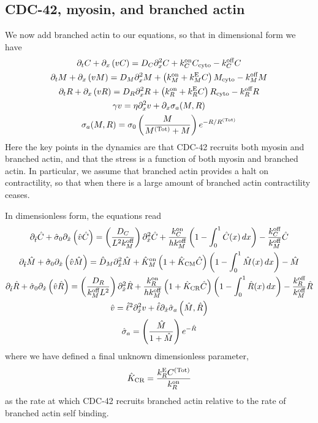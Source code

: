 \documentclass[11pt]{article}
\newcommand{\6}[1]{#1_{\text{6}}}
\newcommand{\3}[1]{#1_{\text{3}}}
\newcommand{\Tot}[1]{#1^\text{(Tot)}}
\newcommand{\C}[1]{#1_C}
\newcommand{\My}[1]{#1_M}
\newcommand{\R}[1]{#1_R}
\begin{document}
\iffalse
\subsection{CDC-42, myosin, and branched actin}
We now add branched actin to our equations, so that in dimensional form we have
\begin{subequations}
\begin{gather}
\Dt C + \Dx \left(v C\right) = D_C \Dx^2 C +\C{\kon}C_\text{cyto} - \C{\koff} C \\
\Dt M + \Dx \left(v M\right) = D_M \Dx^2 M +\left(\My{\kon}+\My{\kE}C\right) M_\text{cyto} - \My{\koff} M\\
\Dt R + \Dx \left(v R\right) = D_R \Dx^2 R+ \left(\R{\kon} + \R{\kE}C \right) R_\text{cyto} - \R{\koff} R\\
\gamma v = \eta \Dx^2 v + \Dx \sigma_a(M,R) \\
\sigma_a(M,R)=\sigma_0 \left(\frac{M}{\Tot{M}+M}\right)e^{-R/\Tot{R}}
\end{gather}
\end{subequations}
Here the key points in the dynamics are that CDC-42 recruits both myosin and branched actin, and that the stress is a function of both myosin and branched actin. In particular, we assume that branched actin provides a halt on contractility, so that when there is a large amount of branched actin contractility ceases.

In dimensionless form, the equations read 
\begin{subequations}
\label{eq:NDBA}
\begin{gather}
\Dthat \hat{C} +\hat{\sigma}_0  \Dxhat \left(\hat{v} \hat{C} \right) =\left(\frac{\C{D}}{L^2 \My{\koff}}\right) \Dxhat^2 \hat{C}+\frac{\C{\kon}}{h \My{\koff}}\left(1-\int_0^1  \hat{C}(x) \, dx\right)-\frac{\C{\koff}}{\My{\koff}} \hat{C}\\
\Dthat \hat{M} +\hat{\sigma}_0  \Dxhat \left(\hat{v} \hat{M} \right) =\hat{D}_M \Dxhat^2 \hat{M} +\hat{K}^\text{on}_M\left(1+\hat{K}_\text{CM}\hat{C}\right) \left(1-\int_0^1  \hat{M}(x) \, dx\right) - \hat{M}\\
\Dthat \hat{R} +\hat{\sigma}_0    \Dxhat \left(\hat{v} \hat{R}\right) = \left(\frac{D_R}{\My{\koff}L^2}\right) \Dxhat^2 \hat{R}+ \frac{\R{\kon}}{h \My{\koff}} \left(1 + \hat{K}_\text{CR}\hat{C} \right)\left(1-\int_0^1  \hat{R}(x) \, dx\right) - \frac{\R{\koff}}{\My{\koff}} \hat R\\ \nonumber
\hat{v} = \hat{\ell}^2 \Dxhat^2 v +\hat{\ell} \Dxhat \hat{\sigma}_a\left(\hat{M},\hat{R}\right)\\
\hat{\sigma}_a = \left(\frac{\hat{M}}{1+\hat{M}} \right) e^{-\hat{R}}
\end{gather}
\end{subequations}
where we have defined a final unknown dimensionless parameter, 
\begin{equation}
\hat{K}_\text{CR}= \frac{\R{\kE}\Tot{C}}{\R{\kon}}
\end{equation}
as the rate at which CDC-42 recruits branched actin relative to the rate of branched actin self binding.
\end{document}
